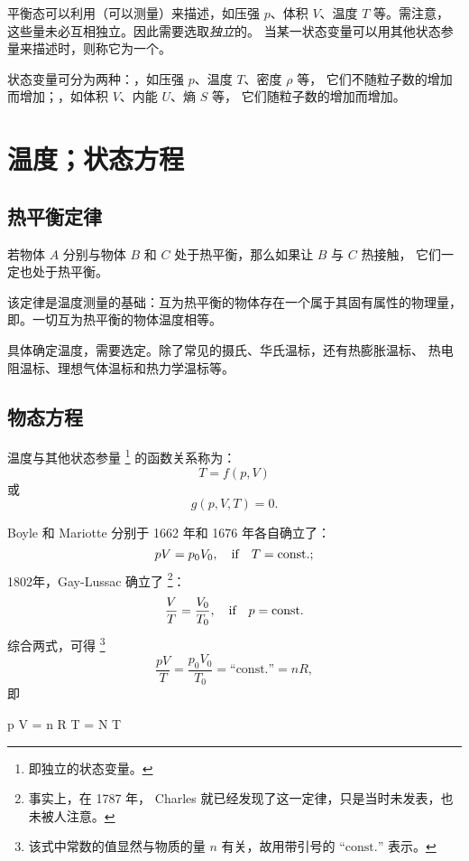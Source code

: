 平衡态可以利用（可以测量）来描述，如压强 $p$、体积 $V$、温度 $T$
等。需注意，这些量未必互相独立。因此需要选取\emph{独立}的。
当某一状态变量可以用其他状态参量来描述时，则称它为一个。

状态变量可分为两种：，如压强 $p$、温度 $T$、密度 $\rho$ 等，
它们不随粒子数的增加而增加；，如体积 $V$、内能 $U$、熵 $S$ 等，
它们随粒子数的增加而增加。

\section{温度；状态方程}

\subsection{热平衡定律}

\begin{theorem}
  若物体 $A$ 分别与物体 $B$ 和 $C$ 处于热平衡，那么如果让 $B$ 与 $C$ 热接触，
  它们一定也处于热平衡。
\end{theorem}

该定律是温度测量的基础：互为热平衡的物体存在一个属于其固有属性的物理量，
即。一切互为热平衡的物体温度相等。

具体确定温度，需要选定。除了常见的摄氏、华氏温标，还有热膨胀温标、
热电阻温标、理想气体温标和热力学温标等。

\subsection{物态方程}

温度与其他状态参量 \footnote{即独立的状态变量。}
的函数关系称为：
\begin{equation}
  T = f(p, V)
\end{equation}
或
\begin{equation}
  g(p, V, T) = 0.
\end{equation}

Boyle 和 Mariotte 分别于 1662 年和 1676 年各自确立了：
\begin{equation}
  p V = p_0 V_0 \qc\qif* T = \const;
\end{equation}
1802年，Gay-Lussac 确立了 \footnote{事实上，在 1787 年，
  Charles 就已经发现了这一定律，只是当时未发表，也未被人注意。}：
\begin{equation}
  \frac{V}{T} = \frac{V_0}{T_0} \qc\qif* p = \const
\end{equation}
综合两式，可得 \footnote{该式中常数的值显然与物质的量 $n$ 有关，故用带引号的
  $\text{``const.''}$ 表示。}
\begin{equation} \label{eq:ideal-gas-law-a}
  \frac{p V}{T} = \frac{p_0 V_0}{T_0} = \text{``const.''} = n R,
\end{equation}
即
\begin{boced} \label{eq:ideal-gas-law-b}
  p V = n R T = N \kB T
\end{boced}

